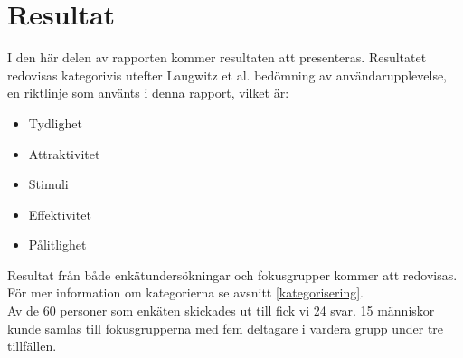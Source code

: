 \section{Resultat}
I den här delen av rapporten kommer resultaten att presenteras. Resultatet redovisas kategorivis utefter Laugwitz et al. \cite{Laugwitz2008ConstructionQuestionnaire} bedömning av användarupplevelse, en riktlinje som använts i denna rapport, vilket är: 
\begin{itemize}
\item Tydlighet
\item Attraktivitet
\item Stimuli
\item Effektivitet
\item Pålitlighet
\end{itemize}
Resultat från både enkätundersökningar och fokusgrupper kommer att redovisas.
För mer information om kategorierna se avsnitt \ref{kategorisering}.\\

Av de 60 personer som enkäten skickades ut till fick vi 24 svar.  15 människor kunde samlas till fokusgrupperna med fem deltagare i vardera grupp under tre tillfällen. \\




 
